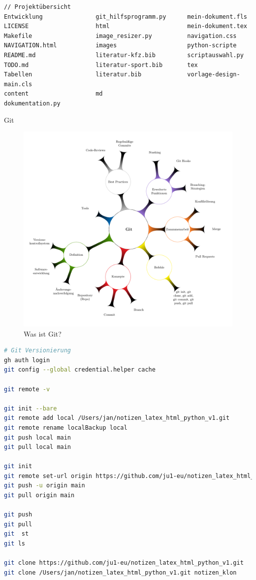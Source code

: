\documentclass{vorlage-design-main}
\begin{document}
\begin{lstlisting}
// Projektübersicht
Entwicklung               git_hilfsprogramm.py      mein-dokument.fls
LICENSE                   html                      mein-dokument.tex
Makefile                  image_resizer.py          navigation.css
NAVIGATION.html           images                    python-scripte
README.md                 literatur-kfz.bib         scriptauswahl.py
TODO.md                   literatur-sport.bib       tex
Tabellen                  literatur.bib             vorlage-design-main.cls
content                   md
dokumentation.py
\end{lstlisting}

Git

\begin{figure}
\centering
\includegraphics[width=0.6\linewidth,keepaspectratio]{images/Mindmap-Git.pdf}
\caption{Was ist Git?}
\end{figure}

\begin{lstlisting}[language=bash]
# Git Versionierung
gh auth login
git config --global credential.helper cache

git remote -v

git init --bare
git remote add local /Users/jan/notizen_latex_html_python_v1.git
git remote rename localBackup local
git push local main
git pull local main

git init
git remote set-url origin https://github.com/ju1-eu/notizen_latex_html_python_v1.git
git push -u origin main
git pull origin main

git push
git pull
git  st
git ls

git clone https://github.com/ju1-eu/notizen_latex_html_python_v1.git
git clone /Users/jan/notizen_latex_html_python_v1.git notizen_klon
\end{lstlisting}
\end{document}
